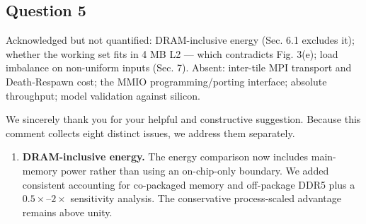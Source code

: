 \subsection{Question 5}
\begin{reviewcomment}
Acknowledged but not quantified: DRAM-inclusive energy (Sec. 6.1 excludes it); whether the working set fits in 4 MB L2 --- which contradicts Fig. 3(e); load imbalance on non-uniform inputs (Sec. 7). Absent: inter-tile MPI transport and Death-Respawn cost; the MMIO programming/porting interface; absolute throughput; model validation against silicon.
\end{reviewcomment}
We sincerely thank you for your helpful and constructive suggestion. Because this comment collects eight distinct issues, we address them separately.
\begin{enumerate}[label=(\arabic*)]
\setlength{\emergencystretch}{1em}
\item \textbf{DRAM-inclusive energy.} The energy comparison now includes main-memory power rather than using an on-chip-only boundary. We added consistent accounting for co-packaged memory and off-package DDR5 plus a $0.5\times$--$2\times$ sensitivity analysis. The conservative process-scaled advantage remains above unity.


\par
\begin{manuscriptexcerpt}
   
\end{manuscriptexcerpt}

\par\noindent\begin{minipage}{\linewidth}
\end{minipage}
\end{enumerate}
